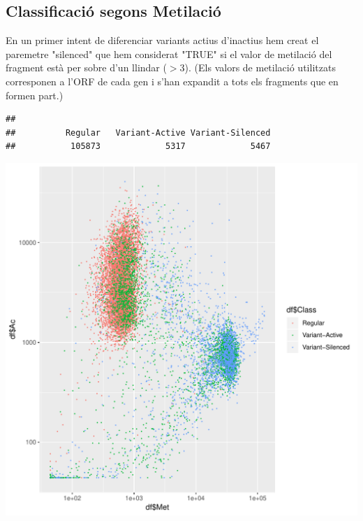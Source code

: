 \documentclass{article}\usepackage[]{graphicx}\usepackage[]{color}
\makeatletter
\newenvironment{kframe}{%
 \def\at@end@of@kframe{}%
 \ifinner\ifhmode%
  \def\at@end@of@kframe{\end{minipage}}%
  \begin{minipage}{\columnwidth}%
 \fi\fi%
 \def\FrameCommand##1{\hskip\@totalleftmargin \hskip-\fboxsep
 \colorbox{shadecolor}{##1}\hskip-\fboxsep
     \hskip-\linewidth \hskip-\@totalleftmargin \hskip\columnwidth}%
 \MakeFramed {\advance\hsize-\width
   \@totalleftmargin\z@ \linewidth\hsize
   \@setminipage}}%
 {\par\unskip\endMakeFramed%
 \at@end@of@kframe}
\newenvironment{knitrout}{}{} %
\makeatother
\begin{document}
\subsection{Classificació segons Metilació}
En un primer intent de diferenciar variants actius d'inactius hem creat el paremetre "silenced" que hem considerat "TRUE" si el valor de metilació del fragment està per sobre d'un llindar ($>$3). (Els valors de metilació utilitzats corresponen a l'ORF de cada gen i s'han expandit a tots els fragments que en formen part.)
\begin{knitrout}
\color{fgcolor}\begin{kframe}
\begin{verbatim}
## 
##          Regular   Variant-Active Variant-Silenced 
##           105873             5317             5467
\end{verbatim}
\end{kframe}

{\centering \includegraphics[width=1\linewidth]{figure/minimal-ac_met_log_status-1} 

}



\end{knitrout}
\clearpage
\end{document}
